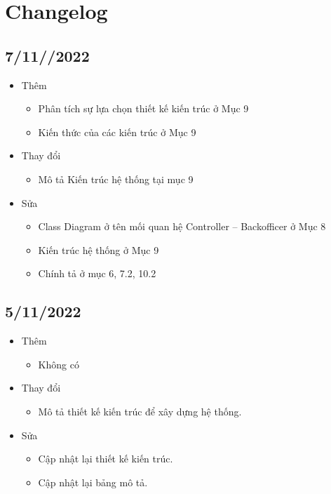   
\section{Changelog}
\subsection{7/11//2022}
    \begin{itemize}
        \item Thêm
            \begin{itemize}
                \item Phân tích sự lựa chọn thiết kế kiến trúc ở Mục 9
                \item Kiến thức của các kiến trúc ở Mục 9
            \end{itemize}
        \item Thay đổi
            \begin{itemize}
                \item Mô tả Kiến trúc hệ thống tại mục 9
            \end{itemize}
        \item Sửa
            \begin{itemize}
                \item Class Diagram ở tên mối quan hệ Controller – Backofficer ở Mục 8
                \item Kiến trúc hệ thống ở Mục 9
                \item Chính tả ở mục 6, 7.2, 10.2
            \end{itemize}
    \end{itemize}
  
    \subsection{5/11/2022}
    \begin{itemize}
        \item Thêm
            \begin{itemize}
                \item Không có
            \end{itemize}
        \item Thay đổi
            \begin{itemize}
                \item Mô tả thiết kế kiến trúc để xây dựng hệ thống.
            \end{itemize}
        \item Sửa
            \begin{itemize}
                \item Cập nhật lại thiết kế kiến trúc.
                \item Cập nhật lại bảng mô tả. 
            \end{itemize}
    \end{itemize}

